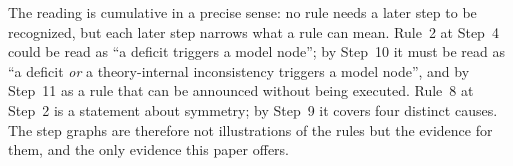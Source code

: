 The reading is cumulative in a precise sense: no rule needs a later step to be recognized, but each later step narrows what a rule can mean. Rule~2 at Step~4 could be read as ``a deficit triggers a model node''; by Step~10 it must be read as ``a deficit \emph{or} a theory-internal inconsistency triggers a model node'', and by Step~11 as a rule that can be announced without being executed. Rule~8 at Step~2 is a statement about symmetry; by Step~9 it covers four distinct causes. The step graphs are therefore not illustrations of the rules but the evidence for them, and the only evidence this paper offers.


